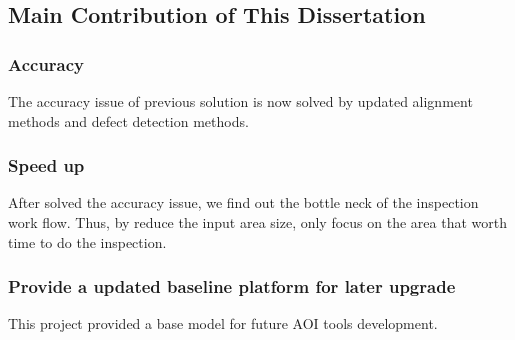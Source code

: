 \subsection{Main Contribution of This Dissertation}
\label{subsec:advantages}

\subsubsection{Accuracy}
The accuracy issue of previous solution is now solved by updated alignment methods and defect detection methods.

\subsubsection{Speed up}
After solved the accuracy issue, we find out the bottle neck of the inspection work flow. Thus, by reduce the input area size, only focus on the area that worth time to do the inspection.

\subsubsection{Provide a updated baseline platform for later upgrade}
This project provided a base model for future AOI tools development.
